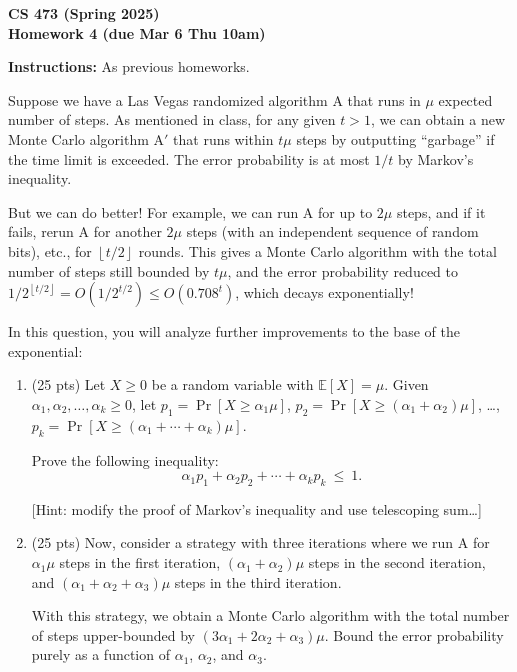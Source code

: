 \documentclass[11pt]{article}
\newcommand{\down}[1]{\left\lfloor #1\right\rfloor}
\newcommand{\Ex}{\mathbb{E}}
\begin{document}
\begin{center}\Large\bf 
CS 473 (Spring 2025)\\
Homework 4 (due Mar 6 Thu 10am)
\end{center}

\medskip\noindent
{\bf Instructions:} As previous homeworks.

\begin{description}
\bigskip
\item[Problem 4.1:]
Suppose we have a Las Vegas randomized algorithm A that 
runs in $\mu$ expected number of steps.  As mentioned in class, for any given $t>1$,
we can obtain a new Monte Carlo algorithm A$'$ that runs within $t\mu$
steps by outputting ``garbage'' if the time limit is exceeded.
The error probability is at most $1/t$ by Markov's inequality.

But we can do better!  For example, we can run A for up to $2\mu$ steps,
and if it fails, rerun A for another $2\mu$ steps (with an independent
sequence of random bits), etc., for $\down{t/2}$ rounds.
This gives a Monte Carlo algorithm with
the total number of steps still bounded by $t\mu$, and the error probability reduced to $1/2^{\down{t/2}} = O(1/2^{t/2}) \le O(0.708^t)$,
which decays exponentially!

In this question, you will analyze further improvements to the base of the exponential:

\begin{enumerate}
\item[(a)] (25 pts) 
Let $X\ge 0$ be a random variable with $\Ex[X]=\mu$.
Given $\alpha_1,\alpha_2,\ldots,\alpha_k\ge 0$, let 
$p_1=\Pr[X\ge \alpha_1\mu]$, $p_2=\Pr[X\ge (\alpha_1+\alpha_2)\mu]$, \ldots,
$p_k=\Pr[X\ge (\alpha_1+\cdots+\alpha_k)\mu]$.

Prove the following inequality:
\[ \alpha_1 p_1 + \alpha_2 p_2 + \cdots + \alpha_k p_k\ \le\ 1. 
\]

[Hint: modify the proof of Markov's inequality and use telescoping sum\ldots]

\smallskip
\item[(b)] (25 pts) Now, consider a strategy with three iterations 
where we run A for $\alpha_1\mu$ steps in the first iteration, $(\alpha_1+\alpha_2)\mu$ steps in the second iteration,
and $(\alpha_1+\alpha_2+\alpha_3)\mu$ steps in the third iteration.

With this strategy, we obtain a Monte Carlo algorithm with
the total number of steps upper-bounded
by $(3\alpha_1 + 2\alpha_2 + \alpha_3)\mu$.  Bound the error probability
purely as a function of $\alpha_1$, $\alpha_2$, and $\alpha_3$.


\end{enumerate}
\end{description}
\end{document}
